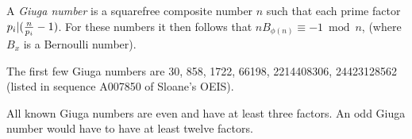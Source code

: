 \documentclass[12pt]{article}
\begin{document}
A \emph{Giuga number} is a squarefree composite number $n$ such that each prime factor $p_i|({n \over {p_i}} - 1)$. For these numbers it then follows that $nB_{\phi(n)} \equiv -1 \bmod n$, (where $B_x$ is a Bernoulli number).

The first few Giuga numbers are 30, 858, 1722, 66198, 2214408306, 24423128562 (listed in sequence A007850 of Sloane's OEIS).

All known Giuga numbers are even and have at least three factors. An odd Giuga number would have to have at least twelve factors.
\end{document}
